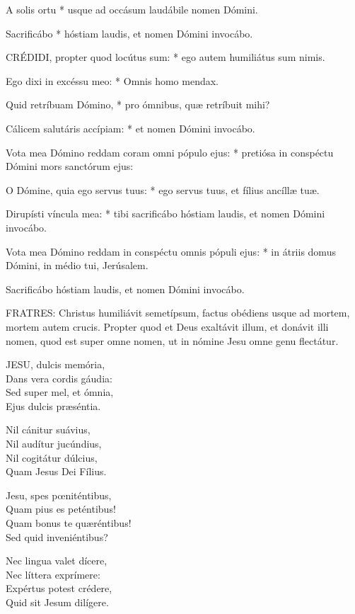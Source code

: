  A solis ortu * usque ad occásum laudábile nomen Dómini.

 Sacrificábo * hóstiam laudis, et nomen Dómini invocábo.


\lettrine[lines=2]{C}{RÉDIDI}, propter quod locútus sum: * ego autem humiliátus sum nimis.

Ego dixi in excéssu meo: * Omnis homo mendax.

Quid retríbuam Dómino, * pro ómnibus, quæ retríbuit mihi?

Cálicem salutáris accípiam: * et nomen Dómini invocábo.

Vota mea Dómino reddam coram omni pópulo ejus: * pretiósa in conspéctu Dómini mors sanctórum ejus:

O Dómine, quia ego servus tuus: * ego servus tuus, et fílius ancíllæ tuæ.

Dirupísti víncula mea: * tibi sacrificábo hóstiam laudis, et nomen Dómini invocábo.

Vota mea Dómino reddam in conspéctu omnis pópuli ejus: * in átriis domus Dómini, in médio tui, Jerúsalem.

 Sacrificábo hóstiam laudis, et nomen Dómini invocábo.


\lettrine[lines=2]{F}{RATRES}: Christus humiliávit semetípsum, factus obédiens usque ad mortem, mortem autem crucis. Propter quod et Deus exaltávit illum, et donávit illi nomen, quod est super omne nomen, ut in nómine Jesu omne genu flectátur.


\lettrine[lines=2]{J}{ESU}, dulcis memória,\\
Dans vera cordis gáudia:\\
Sed super mel, et ómnia,\\
Ejus dulcis præséntia.

Nil cánitur suávius,\\
Nil audítur jucúndius,\\
Nil cogitátur dúlcius,\\
Quam Jesus Dei Fílius.

Jesu, spes pœniténtibus,\\
Quam pius es peténtibus!\\
Quam bonus te quæréntibus!\\
Sed quid inveniéntibus?

Nec lingua valet dícere,\\
Nec líttera exprímere:\\
Expértus potest crédere,\\
Quid sit Jesum dilígere.

